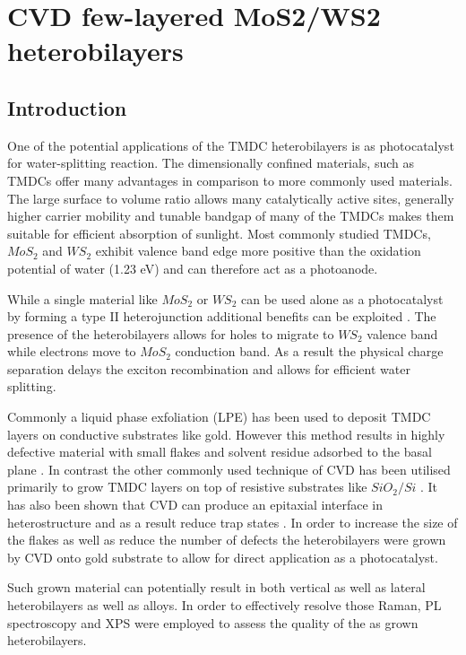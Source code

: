 \chapter{CVD few-layered MoS2/WS2 heterobilayers}
\label{cha:Heterostructures}

\section{Introduction}

One of the potential applications of the TMDC heterobilayers is as photocatalyst for water-splitting reaction. The dimensionally confined materials, such as TMDCs offer many advantages in comparison to more commonly used materials. The large surface to volume ratio allows many catalytically active sites, generally higher carrier mobility and tunable bandgap of many of the TMDCs makes them suitable for efficient absorption of sunlight. Most commonly studied TMDCs, $MoS_2$ and $WS_2$ exhibit valence band edge more positive than the oxidation potential of water (1.23 eV) and can therefore act as a photoanode. 

While a single material like $MoS_2$ or $WS_2$ can be used alone as a photocatalyst by forming a type II heterojunction additional benefits can be exploited \cite{Chen2016}\cite{Wang2013}. The presence of the heterobilayers allows for holes to migrate to $WS_2$ valence band while electrons move to $MoS_2$ conduction band. As a result the physical charge separation delays the exciton recombination and allows for efficient water splitting. 

Commonly a liquid phase exfoliation (LPE) has been used to deposit TMDC layers on conductive substrates like gold. However this method results in highly defective material with small flakes and solvent residue adsorbed to the basal plane \cite{Yu2017}\cite{Yu2016}\cite{Sivula2016}. In contrast the other commonly used technique of CVD has been utilised primarily to grow TMDC layers on top of resistive substrates like $SiO_2/Si$ \cite{Reale2017}. It has also been shown that CVD can produce an epitaxial interface in heterostructure and as a result reduce trap states \cite{Tan2018}. In order to increase the size of the flakes as well as reduce the number of defects the heterobilayers were grown by CVD onto gold substrate to allow for direct application as a photocatalyst.

Such grown material can potentially result in both vertical as well as lateral heterobilayers as well as alloys. In order to effectively resolve those Raman, PL spectroscopy and XPS were employed to assess the quality of the as grown heterobilayers.

